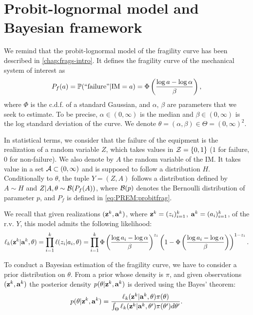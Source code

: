 \section{Probit-lognormal model and Bayesian framework}\label{sec:PREM:model}

We remind that the probit-lognormal model of the fragility curve has been described in   \cref{chap:frags-intro}.
It defines the fragility curve of the mechanical system of interest as 
\begin{equation}\label{eq:PREM:probitfrag}
    P_f(a)=\mathbb{P}(\text{``failure''}|\text{IM}=a) = \Phi\left(\frac{\log a-\log\alpha}{\beta}\right),
\end{equation}
where $\Phi$ is the c.d.f. of a standard Gaussian, and $\alpha$, $\beta$ are parameters that we seek to estimate. To be precise, $\alpha\in(0,\infty)$ is the median and $\beta\in(0,\infty)$ is the log standard deviation of the curve. We denote $\theta=(\alpha,\beta)\in\Theta=(0,\infty)^2$.

In statistical terms, we consider that the failure of the equipment is the realization of a random variable $Z$, which takes values in $\mathcal{Z}=\{0,1\}$ ($1$ for failure, $0$ for non-failure). We also denote by $A$ the random variable of the IM. It takes value in a set $\mathcal{A}\subset(0,\infty)$ and is supposed to follow a distribution $H$. Conditionally to $\theta$, the tuple $Y=(Z,A)$ follows a distribution defined by $A\sim H$ and $Z|A,\theta\sim\mathcal{B}(P_f(A))$, where $\mathcal{B}(p)$ denotes the Bernoulli distribution of parameter $p$, and $P_f$ is defined in \cref{eq:PREM:probitfrag}.

We recall that given realizations $(\mathbf{z}^k,\mathbf{a}^k)$, where $\mathbf{z}^k=(z_i)_{i=1}^k$, $\mathbf{a}^k=(a_i)_{i=1}^k$, of the r.v. $Y$, this model admits the following likelihood:
\begin{equation}\label{eq:PREM:likelihood}
    \ell_k(\mathbf{z}^k|\mathbf{a}^k,\theta) = \prod_{i=1}^k\ell(z_i|a_i,\theta) = \prod_{i=1}^k\Phi\left(\frac{\log a_i-\log\alpha}{\beta}\right)^{z_i}\left(1-\Phi\left(\frac{\log a_i-\log\alpha}{\beta}\right)\right)^{1-z_i}.
\end{equation}


To conduct a Bayesian estimation of the fragility curve, we have to consider a prior distribution on $\theta$.
From a prior whose density is $\pi$, and given observations $(\mathbf{z}^k,\mathbf{a}^k)$ the posterior density $p(\theta|\mathbf{z}^k,\mathbf{a}^k)$ is derived using the Bayes' theorem:
    \begin{equation}\label{eq:PREM:posterior}
        p(\theta|\mathbf{z}^k,\mathbf{a}^k) = \frac{\ell_k(\mathbf{z}^k|\mathbf{a}^k,\theta)\pi(\theta)}{\int_{\Theta}\ell_k(\mathbf{z}^k|\mathbf{a}^k,\theta')\pi(\theta')d\theta'}.
    \end{equation}



